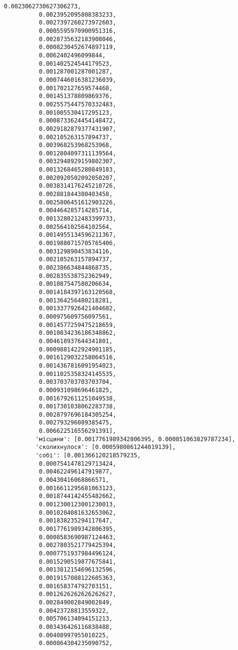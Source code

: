 \documentclass[11pt]{article}
\begin{document}
\begin{Verbatim}[commandchars=\\\{\}]
          0.0023062730627306273,
          0.0023952095808383233,
          0.0027397260273972603,
          0.0005595970900951316,
          0.0028735632183908046,
          0.0008230452674897119,
          0.0062402496099844,
          0.001402524544179523,
          0.001287001287001287,
          0.0007446016381236039,
          0.001702127659574468,
          0.001451378809869376,
          0.0025575447570332483,
          0.001005530417295123,
          0.0008733624454148472,
          0.0029182879377431907,
          0.002105263157894737,
          0.003968253968253968,
          0.0012804097311139564,
          0.0032948929159802307,
          0.0013268465280849183,
          0.0020920502092050207,
          0.0038314176245210726,
          0.002881844380403458,
          0.0025806451612903226,
          0.004464285714285714,
          0.0013280212483399733,
          0.002564102564102564,
          0.0014955134596211367,
          0.0019880715705765406,
          0.003129890453834116,
          0.002105263157894737,
          0.002386634844868735,
          0.002835538752362949,
          0.001087547580206634,
          0.0014184397163120568,
          0.001364256480218281,
          0.0013377926421404682,
          0.000975609756097561,
          0.0014577259475218659,
          0.0010834236186348862,
          0.004618937644341801,
          0.0009881422924901185,
          0.0016129032258064516,
          0.0014367816091954023,
          0.0011025358324145535,
          0.003703703703703704,
          0.000931098696461825,
          0.0016792611251049538,
          0.0017301038062283738,
          0.0028797696184305254,
          0.002793296089385475,
          0.006622516556291391],
         'місцини': [0.0017761989342806395, 0.000851063829787234],
         'сколихнулося': [0.0005980861244019139],
         'собі': [0.001366120218579235,
          0.0007541478129713424,
          0.004622496147919877,
          0.00430416068866571,
          0.0016611295681063123,
          0.0018744142455482662,
          0.0012300123001230013,
          0.0010204081632653062,
          0.001838235294117647,
          0.0017761989342806395,
          0.0008583690987124463,
          0.0027803521779425394,
          0.0007751937984496124,
          0.0015290519877675841,
          0.0013812154696132596,
          0.0019157088122605363,
          0.001658374792703151,
          0.0012626262626262627,
          0.002849002849002849,
          0.00423728813559322,
          0.005706134094151213,
          0.003436426116838488,
          0.00408997955010225,
          0.000864304235090752,

\end{Verbatim}
\end{document}

